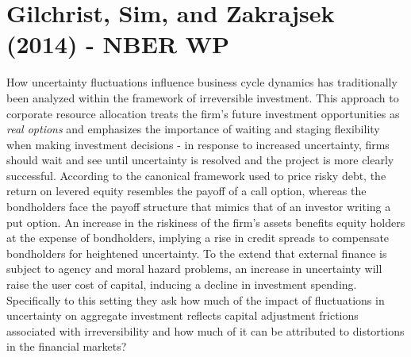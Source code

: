 \documentclass{article}
\begin{document}
{\section{Gilchrist, Sim, and Zakrajsek (2014) - NBER WP}

How uncertainty fluctuations influence business cycle dynamics has traditionally been analyzed within the framework of irreversible investment. This approach to corporate resource allocation treats the firm's future investment opportunities as \textit{real options} and emphasizes the importance of waiting and staging flexibility when making investment decisions - in response to increased uncertainty, firms should wait and see until uncertainty is resolved and the project is more clearly successful. According to the canonical framework used to price risky debt, the return on levered equity resembles the payoff of a call option, whereas the bondholders face the payoff structure that mimics that of an investor writing a put option. An increase in the riskiness of the firm's assets benefits equity holders at the expense of bondholders, implying a rise in credit spreads to compensate bondholders for heightened uncertainty. To the extend that external finance is subject to agency and moral hazard problems, an increase in uncertainty will raise the user cost of capital, inducing a decline in investment spending. Specifically to this setting they ask how much of the impact of fluctuations in uncertainty on aggregate investment reflects capital adjustment frictions associated with irreversibility and how much of it can be attributed to distortions in the financial markets?

}
\end{document}
